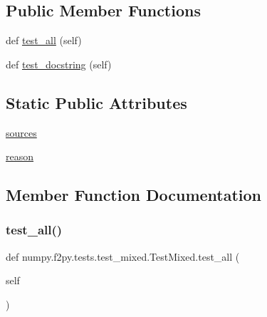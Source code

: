 \subsection*{Public Member Functions}
\begin{DoxyCompactItemize}
\item 
def \hyperlink{classnumpy_1_1f2py_1_1tests_1_1test__mixed_1_1TestMixed_aed2e2cf4c1d8d3f34ffb984e9831735b}{test\+\_\+all} (self)
\item 
def \hyperlink{classnumpy_1_1f2py_1_1tests_1_1test__mixed_1_1TestMixed_aa60f99c009a368e97be3ad290de57372}{test\+\_\+docstring} (self)
\end{DoxyCompactItemize}
\subsection*{Static Public Attributes}
\begin{DoxyCompactItemize}
\item 
\hyperlink{classnumpy_1_1f2py_1_1tests_1_1test__mixed_1_1TestMixed_a8611ed57a65cec3b9793ddfd32429c3e}{sources}
\item 
\hyperlink{classnumpy_1_1f2py_1_1tests_1_1test__mixed_1_1TestMixed_a5fd0f480f358cd989a684796b53120fd}{reason}
\end{DoxyCompactItemize}


\subsection{Member Function Documentation}
\mbox{\label{classnumpy_1_1f2py_1_1tests_1_1test__mixed_1_1TestMixed_aed2e2cf4c1d8d3f34ffb984e9831735b}} 
\subsubsection{\texorpdfstring{test\+\_\+all()}{test\_all()}}
{\footnotesize\ttfamily def numpy.\+f2py.\+tests.\+test\+\_\+mixed.\+Test\+Mixed.\+test\+\_\+all (\begin{DoxyParamCaption}\item[{}]{self }\end{DoxyParamCaption})}

